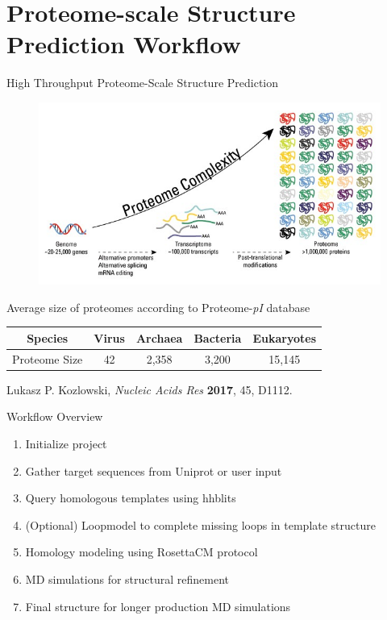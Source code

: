 \documentclass{beamer}
\begin{document}
\section{Proteome-scale Structure Prediction Workflow}   
\begin{frame}{High Throughput Proteome-Scale Structure Prediction}
\vspace{-.5cm}
\begin{figure}
	\includegraphics[width=\linewidth]{Pics/proteome}
\end{figure}
Average size of proteomes according to Proteome-\emph{pI} database
\begin{tabular}{c|c|c|c|c}
	\hline
	Species & Virus & Archaea & Bacteria & Eukaryotes \\
	\hline
	Proteome Size & 42 & 2,358 & 3,200 & 15,145 \\
	\hline
\end{tabular}

\vspace{.5cm}
\hfill {\tiny Lukasz P. Kozlowski, \emph{Nucleic Acids Res} \textbf{2017}, 45, D1112.}
\end{frame}

\begin{frame}{Workflow Overview}
\begin{enumerate}
	\item Initialize project 
	\item Gather target sequences from Uniprot or user input 
	\item Query homologous templates using hhblits 
	\item (Optional) Loopmodel to complete missing loops in template structure
	\item Homology modeling using RosettaCM protocol 
	\item MD simulations for structural refinement 
	\item Final structure for longer production MD simulations
\end{enumerate}
\end{frame}
\end{document}
